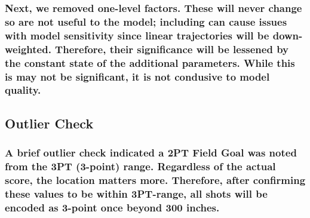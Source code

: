 \documentclass[]{article}
\begin{document}
\hypertarget{next-we-removed-one-level-factors.-these-will-never-change-so-are-not-useful-to-the-model-including-can-cause-issues-with-model-sensitivity-since-linear-trajectories-will-be-down-weighted.-therefore-their-significance-will-be-lessened-by-the-constant-state-of-the-additional-parameters.-while-this-is-may-not-be-significant-it-is-not-condusive-to-model-quality.}{%
\subsubsection{Next, we removed one-level factors. These will never
change so are not useful to the model; including can cause issues with
model sensitivity since linear trajectories will be down-weighted.
Therefore, their significance will be lessened by the constant state of
the additional parameters. While this is may not be significant, it is
not condusive to model
quality.}\label{next-we-removed-one-level-factors.-these-will-never-change-so-are-not-useful-to-the-model-including-can-cause-issues-with-model-sensitivity-since-linear-trajectories-will-be-down-weighted.-therefore-their-significance-will-be-lessened-by-the-constant-state-of-the-additional-parameters.-while-this-is-may-not-be-significant-it-is-not-condusive-to-model-quality.}}

\hypertarget{outlier-check}{%
\subsection{\texorpdfstring{\textbf{Outlier
Check}}{Outlier Check}}\label{outlier-check}}

\hypertarget{a-brief-outlier-check-indicated-a-2pt-field-goal-was-noted-from-the-3pt-3-point-range.-regardless-of-the-actual-score-the-location-matters-more.-therefore-after-confirming-these-values-to-be-within-3pt-range-all-shots-will-be-encoded-as-3-point-once-beyond-300-inches.}{%
\subsubsection{A brief outlier check indicated a 2PT Field Goal was
noted from the 3PT (3-point) range. Regardless of the actual score, the
location matters more. Therefore, after confirming these values to be
within 3PT-range, all shots will be encoded as 3-point once beyond 300
inches.}\label{a-brief-outlier-check-indicated-a-2pt-field-goal-was-noted-from-the-3pt-3-point-range.-regardless-of-the-actual-score-the-location-matters-more.-therefore-after-confirming-these-values-to-be-within-3pt-range-all-shots-will-be-encoded-as-3-point-once-beyond-300-inches.}}
\end{document}
